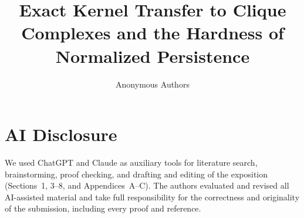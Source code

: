 \documentclass[a4paper,UKenglish,cleveref,numberwithinsect,anonymous]{lipics-v2021}
\title{Exact Kernel Transfer to Clique Complexes and the Hardness of
Normalized Persistence}
\author{Anonymous Authors}{Anonymous affiliation}{}{}{}
\begin{document}
\raggedbottom
\maketitle

\begin{abstract}

\end{abstract}










\clearpage



\clearpage
\appendix




\section*{AI Disclosure}
We used ChatGPT and Claude as auxiliary tools for literature search,
brainstorming, proof checking, and drafting and editing of the exposition
(Sections~1, 3--8, and Appendices~A--C).
The authors evaluated and revised all AI-assisted material and take full
responsibility for the correctness and originality of the submission,
including every proof and reference.
\end{document}
